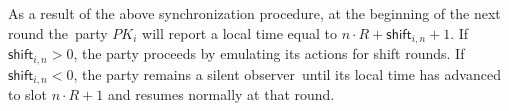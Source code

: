As a result of the above synchronization procedure, at the beginning of the next round the\
party $PK_i$ will report a local time equal to $n \cdot R + \textsf{shift}_{i, n} + 1$.
If ${\textsf{shift}_{i, n} > 0}$, the party proceeds by emulating its actions for shift rounds.
If ${\textsf{shift}_{i, n} < 0}$, the party remains a silent observer\
until its local time has advanced to slot $n \cdot R + 1$ and resumes normally at that round.